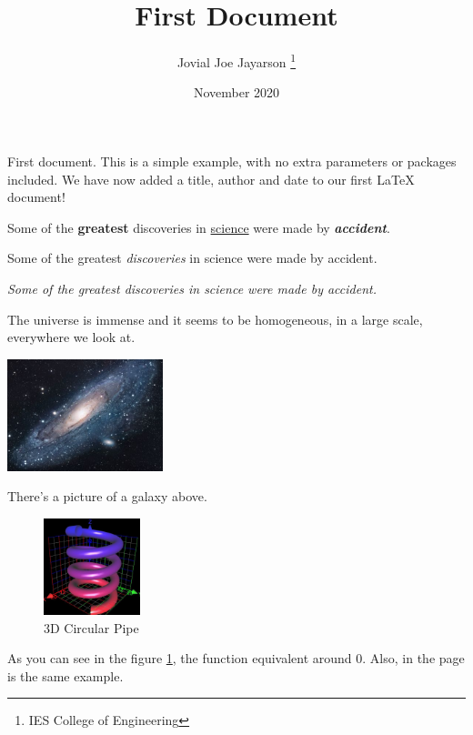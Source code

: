 \documentclass[12pt, a4paper]{article}
\title{First Document}
\author{Jovial Joe Jayarson \thanks{IES College of Engineering}}
\date{November 2020}
\begin{document}
\maketitle %

First document. This is a simple example, with no extra parameters or packages included. We have now added a title, author and date to our first \LaTeX{} document!


Some of the \textbf{greatest} discoveries in \underline{science} were made by \textbf{\textit{accident}}. %

Some of the greatest \emph{discoveries} in science were made by accident.

\textit{Some of the greatest \emph{discoveries} in science were made by accident.}


The universe is immense and it seems to be homogeneous, in a large scale, everywhere we look at.

\includegraphics{universe} %

There's a picture of a galaxy above.

\begin{figure}[h] %
    \centering
    \includegraphics[width=0.25\textwidth]{graph}
    \caption{3D Circular Pipe}
    \label{fig:3D Torus}
\end{figure}

As you can see in the figure \ref{fig:3D Torus}, the function equivalent around 0. Also, in the page \pageref{fig:3D Torus}
is the same example.
\end{document}
